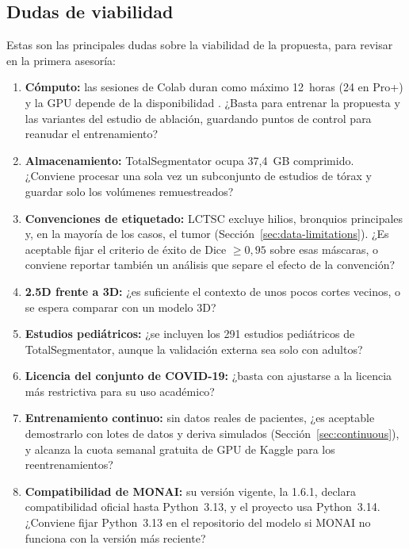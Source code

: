 \subsection{Dudas de viabilidad}\label{sec:feasibility}
Estas son las principales dudas sobre la viabilidad de la propuesta, para
revisar en la primera asesoría:

\begin{enumerate}
    \item \textbf{Cómputo:} las sesiones de Colab duran como máximo 12~horas
          (24 en Pro+) y la GPU depende de la disponibilidad
          \parencite{colabpricing}. ¿Basta para entrenar la propuesta y las
          variantes del estudio de ablación, guardando puntos de control para
          reanudar el entrenamiento?
    \item \textbf{Almacenamiento:} TotalSegmentator ocupa 37,4~GB comprimido.
          ¿Conviene procesar una sola vez un subconjunto de estudios de tórax
          y guardar solo los volúmenes remuestreados?
    \item \textbf{Convenciones de etiquetado:} LCTSC excluye hilios, bronquios
          principales y, en la mayoría de los casos, el tumor
          (Sección~\ref{sec:data-limitations}). ¿Es aceptable fijar el
          criterio de éxito de Dice $\geq 0{,}95$ sobre esas máscaras, o
          conviene reportar también un análisis que separe el efecto de la
          convención?
    \item \textbf{2.5D frente a 3D:} ¿es suficiente el contexto de unos pocos
          cortes vecinos, o se espera comparar con un modelo 3D?
    \item \textbf{Estudios pediátricos:} ¿se incluyen los 291 estudios
          pediátricos de TotalSegmentator, aunque la validación externa sea
          solo con adultos?
    \item \textbf{Licencia del conjunto de COVID-19:} ¿basta con ajustarse a la
          licencia más restrictiva para su uso académico?
    \item \textbf{Entrenamiento continuo:} sin datos reales de pacientes, ¿es
          aceptable demostrarlo con lotes de datos y deriva simulados
          (Sección~\ref{sec:continuous}), y alcanza la cuota semanal gratuita
          de GPU de Kaggle para los reentrenamientos?
    \item \textbf{Compatibilidad de MONAI:} su versión vigente, la 1.6.1,
          declara compatibilidad oficial hasta Python~3.13, y el proyecto usa
          Python~3.14. ¿Conviene fijar Python~3.13 en el repositorio del modelo
          si MONAI no funciona con la versión más reciente?
\end{enumerate}

